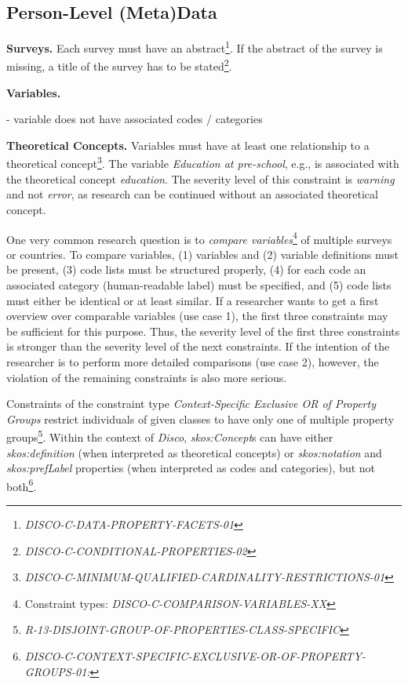 \documentclass{llncs}
\begin{document}
\subsection{Person-Level (Meta)Data}

\textbf{Surveys.}
Each survey must have an abstract\footnote{\emph{DISCO-C-DATA-PROPERTY-FACETS-01}}. 
If the abstract of the survey is missing, a title of the survey has to be stated\footnote{\emph{DISCO-C-CONDITIONAL-PROPERTIES-02}}.

\textbf{Variables.}

- variable does not have associated codes / categories

\textbf{Theoretical Concepts.}
Variables must have at least one relationship to a theoretical concept\footnote{\emph{DISCO-C-MINIMUM-QUALIFIED-CARDINALITY-RESTRICTIONS-01}}.
The variable \emph{Education at pre-school}, e.g., is associated with the theoretical concept \emph{education}. 
The severity level of this constraint is \emph{warning} and not \emph{error}, as research can be continued without an associated theoretical concept.

One very common research question is to \emph{compare variables}\footnote{Constraint types: \emph{DISCO-C-COMPARISON-VARIABLES-XX}} of multiple surveys or countries.
To compare variables, 
(1) variables and (2) variable definitions must be present,
(3) code lists must be structured properly,
(4) for each code an associated category (human-readable label) must be specified, and
(5) code lists must either be identical or at least similar.
If a researcher wants to get a first overview over comparable variables (use case 1), 
the first three constraints may be sufficient for this purpose.
Thus, the severity level of the first three constraints is stronger than the severity level of the next constraints.
If the intention of the researcher is to perform more detailed comparisons (use case 2), however, the violation of the remaining constraints is also more serious.

Constraints of the constraint type \emph{Context-Specific Exclusive OR of Property Groups}
restrict individuals of given classes to have only one of multiple property groups\footnote{\emph{R-13-DISJOINT-GROUP-OF-PROPERTIES-CLASS-SPECIFIC}}.
Within the context of \emph{Disco}, \emph{skos:Concept}s can have either \emph{skos:definition} (when interpreted as theoretical concepts) or \emph{skos:notation} and \emph{skos:prefLabel} properties (when interpreted as codes and categories), but not both\footnote{\emph{DISCO-C-CONTEXT-SPECIFIC-EXCLUSIVE-OR-OF-PROPERTY-GROUPS-01:}}.
\end{document}
